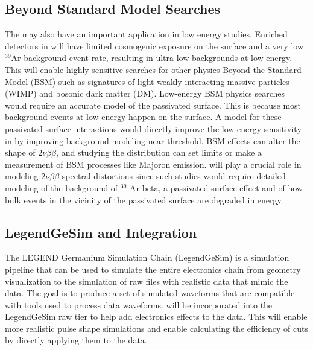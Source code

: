 \subsection{Beyond Standard Model Searches}
The {\ehd} may also have an important application in low energy studies. Enriched detectors in {\Lthou} will have limited cosmogenic exposure on the surface and a very low $^{39}$Ar background event rate, resulting in ultra-low backgrounds at low energy. This will enable highly sensitive searches for other physics Beyond the Standard Model (BSM) such as signatures of light weakly interacting massive particles (WIMP) and bosonic dark matter (DM). Low-energy BSM physics searches would require an accurate model of the passivated surface. This is because most background events at low energy happen on the surface. A model for these passivated surface interactions would directly improve the low-energy sensitivity in {\Lthou} by improving background modeling near threshold. BSM effects can alter the shape of $2\nu\beta\beta$, and studying the distribution can set limits or make a measurement of BSM processes like Majoron emission. {\ehd} will play a crucial role in modeling $2\nu\beta\beta$ spectral distortions since such studies would require detailed modeling of the background of $^{39}$ Ar beta, a passivated surface effect and of how bulk events in the vicinity of the passivated surface are degraded in energy.

\subsection{LegendGeSim and {\cpunet} Integration}
The LEGEND Germanium Simulation Chain (LegendGeSim) is a simulation pipeline that can be used to simulate the entire electronics chain from geometry visualization to the simulation of raw files with realistic data that mimic the data. The goal is to produce a set of simulated waveforms that are compatible with tools used to process data waveforms. {\cpunet} will be incorporated into the LegendGeSim raw tier to help add electronics effects to the data. This will enable more realistic pulse shape simulations and enable calculating the efficiency of cuts by directly applying them to the data.